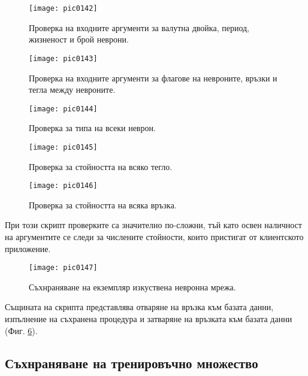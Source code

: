 \begin{figure}[h]
  \centering
  \texttt{[image: pic0142]}
  \caption{Проверка на входните аргументи за валутна двойка, период, жизненост и брой неврони.}
\label{fig:pic0142}
\end{figure}
\FloatBarrier

\begin{figure}[h]
  \centering
  \texttt{[image: pic0143]}
  \caption{Проверка на входните аргументи за флагове на невроните, връзки и тегла между невроните.}
\label{fig:pic0143}
\end{figure}
\FloatBarrier

\begin{figure}[h]
  \centering
  \texttt{[image: pic0144]}
  \caption{Проверка за типа на всеки неврон.}
\label{fig:pic0144}
\end{figure}
\FloatBarrier

\begin{figure}[h]
  \centering
  \texttt{[image: pic0145]}
  \caption{Проверка за стойността на всяко тегло.}
\label{fig:pic0145}
\end{figure}
\FloatBarrier

\begin{figure}[h]
  \centering
  \texttt{[image: pic0146]}
  \caption{Проверка за стойността на всяка връзка.}
\label{fig:pic0146}
\end{figure}
\FloatBarrier

При този скрипт проверките са значително по-сложни, тъй като освен наличност на аргументите се следи за числените стойности, които пристигат от клиентското приложение. 

\begin{figure}[h]
  \centering
  \texttt{[image: pic0147]}
  \caption{Съхнраняване на екземпляр изкуствена невронна мрежа.}
\label{fig:pic0147}
\end{figure}
\FloatBarrier

Същината на скрипта представлява отваряне на връзка към базата данни, изпълнение на съхранена процедура и затваряне на връзката към базата данни (Фиг. \ref{fig:pic0147}).

\subsection{Съхнраняване на тренировъчно множество}

